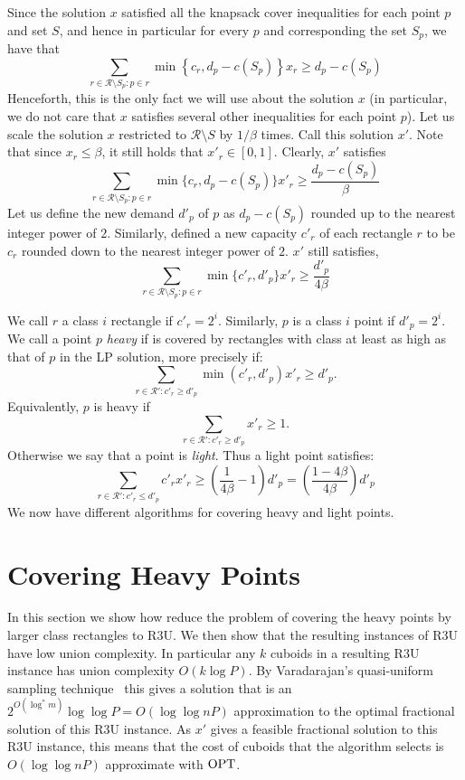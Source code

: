 \documentclass[11pt]{article}
\def \OPT  {\mbox{\rm OPT}}
\begin{document}
Since the solution $x$ satisfied all the knapsack cover inequalities for each point $p$ and set $S$, and hence in particular 
for every $p$ and corresponding the set $S_p$, we have
that 
$$ \sum_{ r \in {\mathcal R}\setminus S_p: p \in r} 
\min \left\{ c_r, d_p - c(S_p) \right\} x_{r} \ge d_p - c(S_p) $$
Henceforth, this is the only fact we will use about the solution $x$ (in particular, we do not care that $x$
satisfies  several other inequalities for each point $p$).
Let us scale the solution $x$ restricted to ${\mathcal R} \setminus S$ by $1/\beta$ times. Call this solution $x'$. Note that since $x_r \leq \beta$, it still holds that   $x'_r \in [0,1]$.  Clearly, $x'$ satisfies
$$ \sum_{ r \in {\mathcal R}\setminus S_p: p \in r} 
\min \{ c_r, d_p - c(S_p) \} x'_{r} \ge \frac{d_p - c(S_p)}{\beta} $$
Let us define the new demand $d'_p$ of $p$ as 
$d_p - c(S_p)$ rounded up to the nearest integer power of $2$.
Similarly, defined a new capacity $c'_r$ of 
each rectangle $r$ to be $c_r$ rounded down to the nearest integer power of $2$.
$x'$ still satisfies,
$$ \sum_{ r \in {\mathcal R}\setminus S_p: p \in r}  \min \{ c'_r, d'_p \} x'_{r} \ge  \frac{d'_p}{4\beta} $$

We call $r$ a class $i$ rectangle if $c'_r=2^i$. Similarly, $p$ is a class $i$ point if $d'_p=2^i$.
We call a point $p$ {\em heavy} if is covered by rectangles with class at least as high as that of $p$ in the LP solution, more precisely
if:
\begin{equation}
\label{eq:heavy}
\sum_{r \in {\mathcal R}': c'_r \geq  d'_p} \min(c'_r, d'_p) x'_{r} \ge d'_p. 
\end{equation}
Equivalently, $p$ is heavy if 
$$\sum_{r \in {\mathcal R}': c'_r \geq  d'_p}  x'_{r} \ge 1.$$ 
Otherwise we say that a point is {\em light}. Thus a light point satisfies:
\begin{equation}
\label{eq:med1}
\sum_{r \in {\mathcal R}': c'_r \leq  d'_p}  c'_r x'_{r} \ge 
\left(\frac{1}{4\beta}-1\right) d'_p =
\left(\frac{1 - 4 \beta}{4\beta}\right) d'_p
\end{equation}
We now have different algorithms for covering heavy and light points.

\section{Covering Heavy Points}
\label{sec:heavy}

In this section 
we show how reduce the problem of covering the heavy
points by larger class rectangles to R3U.
We then show that the resulting instances of R3U have low union complexity.
In particular any $k$ cuboids in a resulting R3U instance
has union complexity $O(k \log P)$.
By Varadarajan's quasi-uniform sampling technique~\cite{Varadarajan09}
this gives 
a solution that is an $2^{O(\log^*m)} \log \log P = O(\log \log nP)$ approximation to the 
optimal fractional solution of this R3U instance. 
As $x'$ gives
a feasible fractional solution to this R3U instance, this means
that the cost of cuboids that the algorithm selects is  $O(\log \log nP)$
approximate with $\OPT$.
\end{document}
